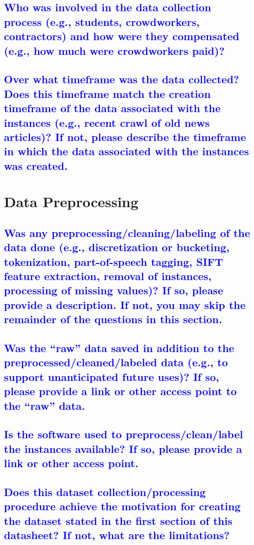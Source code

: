 \documentclass[letterpaper, 10 pt, conference]{ieeeconf}  %
\begin{document}
\textcolor{blue}{\subsection{Who was involved in the data collection process (e.g., students,
crowdworkers, contractors) and how were they compensated (e.g.,
how much were crowdworkers paid)?}}
\lipsum[1]

\textcolor{blue}{\subsection{Over what timeframe was the data collected? Does this timeframe
match the creation timeframe of the data associated with the instances
(e.g., recent crawl of old news articles)? If not, please describe the timeframe in which the data associated with the instances was created.}}
\lipsum[1]

\section{Data Preprocessing}

\textcolor{blue}{\subsection{Was any preprocessing/cleaning/labeling of the data done (e.g., discretization or bucketing, tokenization, part-of-speech tagging, SIFT
feature extraction, removal of instances, processing of missing values)? If so, please provide a description. If not, you may skip the remainder of the questions in this section.}}
\lipsum[1]


\textcolor{blue}{\subsection{Was the “raw” data saved in addition to the preprocessed/cleaned/labeled data (e.g., to support unanticipated
future uses)? If so, please provide a link or other access point to the
“raw” data.}}
\lipsum[1]

\textcolor{blue}{\subsection{Is the software used to preprocess/clean/label the instances available? If so, please provide a link or other access point.}}
\lipsum[1]



\textcolor{blue}{\subsection{Does this dataset collection/processing procedure
achieve the motivation for creating the dataset
stated in the first section of this datasheet? If not,
what are the limitations?}}
\lipsum[1]
\end{document}
